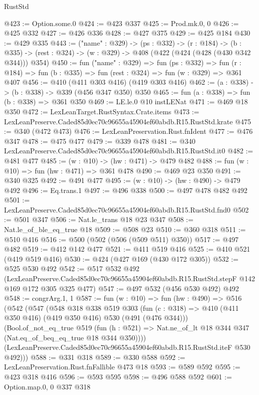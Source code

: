 \begin{lexlean}{RustStd}
\begin{coremodule}
@423 := Option.some.{0}
@424 := @423 @337
@425 := Prod.mk.{0, 0}
@426 := @425 @332
@427 := @426 @336
@428 := @427 @375
@429 := @425 @184
@430 := @429 @335
@443 := ("name" : @329) ->
  (ps : @332) ->
  (r : @184) ->
  (b : @335) -> (rest : @324) -> (w : @329) -> @408 (@422 (@424 (@428 (@430 @342 @344))) @354)
@450 := fun ("name" : @329) =>
  fun (ps : @332) =>
  fun (r : @184) => fun (b : @335) => fun (rest : @324) => fun (w : @329) => @361 @407
@456 := @410 (@411 @303 @416) (@419 @303 @416)
@462 := (a : @338) -> (b : @338) -> @339 (@456 @347 @350) @350
@465 := fun (a : @338) => fun (b : @338) => @361 @350
@469 := LE.le.{0} @10 instLENat
@471 := @469 @18 @350
@472 := LexLeanTarget.RustSyntax.Crate.items
@473 := LexLeanPreserve.Caded85d0ec70c96655a45904ef60abdb.R15.RustStd.krate
@475 := @340 (@472 @473)
@476 := LexLeanPreservation.Rust.fnIdent
@477 := @476 @347
@478 := @475 @477
@479 := @339 @478
@481 := @340 LexLeanPreserve.Caded85d0ec70c96655a45904ef60abdb.R15.RustStd.it0
@482 := @481 @477
@485 := (w : @10) -> (hw : @471) -> @479 @482
@488 := fun (w : @10) => fun (hw : @471) => @361 @478
@490 := @469 @23 @350
@491 := @340 @325
@492 := @491 @477
@495 := (w : @10) -> (hw : @490) -> @479 @492
@496 := Eq.trans.{1}
@497 := @496 @338
@500 := @497 @478 @482 @492
@501 := LexLeanPreserve.Caded85d0ec70c96655a45904ef60abdb.R15.RustStd.fnd0
@502 := @501 @347
@506 := Nat.le_trans @18 @23 @347
@508 := Nat.le_of_ble_eq_true @18
@509 := @508 @23
@510 := @360 @318
@511 := @510 @416
@516 := @500 (@502 (@506 (@509 @511) @350))
@517 := @497 @482
@519 := @412 @142 @477
@521 := @411 @519 @416
@525 := @410 @521 (@419 @519 @416)
@530 := @424 (@427 @169 (@430 @172 @305))
@532 := @525 @530 @492
@542 := @517
    @532
    @492
    (LexLeanPreserve.Caded85d0ec70c96655a45904ef60abdb.R15.RustStd.stepF
      @142
      @169
      @172
      @305
      @325
      @477)
@547 := @497 @532 (@456 @530 @492) @492
@548 := congrArg.{1, 1}
@587 := fun (w : @10) =>
  fun (hw : @490) =>
  @516
    (@542
      (@547
        (@548
          @318
          @338
          @519
          @303
          (fun (c : @318) => @410 (@411 @350 @416) (@419 @350 @416) @530 (@491 (@476 @344)))
          (Bool.of_not_eq_true
            @519
            (fun (h : @521) => Nat.ne_of_lt @18 @344 @347 (Nat.eq_of_beq_eq_true @18 @344 @350))))
        (LexLeanPreserve.Caded85d0ec70c96655a45904ef60abdb.R15.RustStd.iteF @530 @492)))
@588 := @331 @318
@589 := @330 @588
@592 := LexLeanPreservation.Rust.fnFallible @473 @18
@593 := @589 @592
@595 := @423 @318 @416
@596 := @593 @595
@598 := @496 @588 @592
@601 := Option.map.{0, 0} @337 @318

\end{coremodule}
\end{lexlean}
